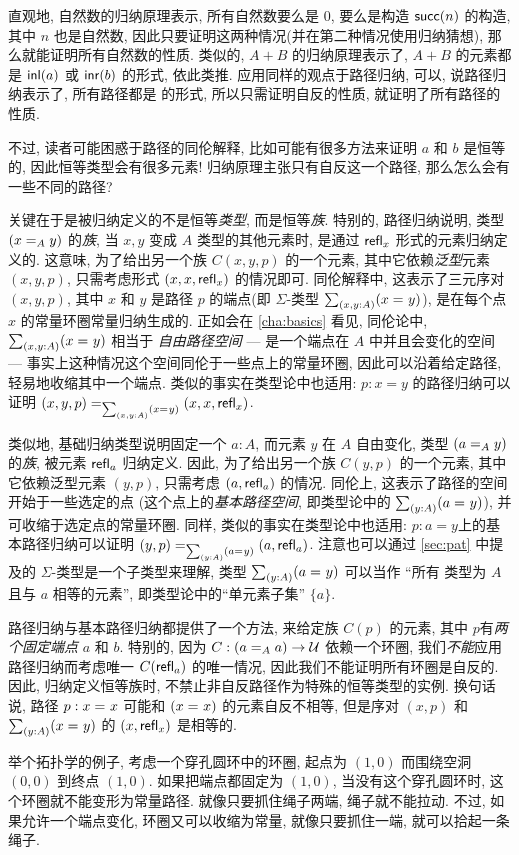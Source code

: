 \begin{rmk}
    \label{rmk:the-only-path-is-refl}
    直观地, 自然数的归纳原理表示, 所有自然数要么是 $0$, 要么是构造 $\suc(n)$ 的构造, 其中 $n$ 也是自然数, 因此只要证明这两种情况(并在第二种情况使用归纳猜想), 那么就能证明所有自然数的性质.
    类似的, $A+B$ 的归纳原理表示了, $A+B$ 的元素都是 $\inl(a)$ 或 $\inr(b)$ 的形式, 依此类推.
    应用同样的观点于路径归纳, 可以, 说路径归纳表示了, 所有路径都是  的形式, 所以只需证明自反的性质, 就证明了所有路径的性质.

    不过, 读者可能困惑于路径的同伦解释, 比如可能有很多方法来证明 $a$ 和 $b$ 是恒等的, 因此恒等类型会有很多元素!
    归纳原理主张只有自反这一个路径, 那么怎么会有一些不同的路径?

    关键在于是被归纳定义的不是恒等\emph{类型}, 而是恒等\emph{族}.
    特别的, 路径归纳说明, 类型 $(\id[A]{x}{y})$ 的\emph{族}, 当 $x,y$ 变成 $A$ 类型的其他元素时, 是通过 $\refl{x}$ 形式的元素归纳定义的.
    这意味, 为了给出另一个族 $C(x,y,p)$ 的一个元素, 其中它依赖\emph{泛型}元素 $(x,y,p)$, 只需考虑形式 $(x,x,\refl{x})$ 的情况即可.
    同伦解释中, 这表示了三元序对 $(x,y,p)$, 其中 $x$ 和 $y$ 是路径 $p$ 的端点(即 $\Sigma$-类型 $\sm{x,y:A}(\id{x}{y})$), 是在每个点 $x$ 的常量环圈常量归纳生成的.
    正如会在 \cref{cha:basics} 看见, 同伦论中, $\sm{x,y:A}(\id{x}{y})$ 相当于 \emph{自由路径空间} --- 是一个端点在 $A$ 中并且会变化的空间 --- 事实上这种情况这个空间同伦于一些点上的常量环圈, 因此可以沿着给定路径, 轻易地收缩其中一个端点.
    类似的事实在类型论中也适用: $p:x=y$ 的路径归纳可以证明 $\id[\sm{x,y:A}(\id{x}{y})]{(x,y,p)}{(x,x,\refl{x})}$.

    类似地, 基础归纳类型说明固定一个 $a:A$, 而元素 $y$ 在 $A$ 自由变化, 类型 $(\id[A]{a}{y})$ 的\emph{族}, 被元素 $\refl{a}$ 归纳定义.
    因此, 为了给出另一个族 $C(y,p)$ 的一个元素, 其中它依赖泛型元素 $(y,p)$, 只需考虑 $(a,\refl{a})$ 的情况.
    同伦上, 这表示了路径的空间开始于一些选定的点 (这个点上的\emph{基本路径空间}, 即类型论中的 $\sm{y:A} (\id{a}{y})$), 并可收缩于选定点的常量环圈.
    同样, 类似的事实在类型论中也适用: $p:a=y$上的基本路径归纳可以证明 $\id[\sm{y:A}(\id{a}{y})]{(y,p)}{(a,\refl{a})}$.
    注意也可以通过 \cref{sec:pat} 中提及的 $\Sigma$-类型是一个子类型来理解, 类型 $\sm{y:A}(\id{a}{y})$ 可以当作 ``所有 类型为 $A$ 且与 $a$ 相等的元素'', 即类型论中的``单元素子集'' $\{a\}$.

    路径归纳与基本路径归纳都提供了一个方法, 来给定族 $C(p)$ 的元素, 其中 $p$有\emph{两个固定端点} $a$ 和 $b$.
    特别的, 因为 $C: (\id[A]{a}{a}) \to \UU$ 依赖一个环圈, 我们\emph{不能}应用路径归纳而考虑唯一 $C(\refl{a})$ 的唯一情况, 因此我们不能证明所有环圈是自反的.
    因此, 归纳定义恒等族时, 不禁止非自反路径作为特殊的恒等类型的实例.
    换句话说, 路径 $p:\id{x}{x}$ 可能和 $(\id{x}{x})$ 的元素自反不相等, 但是序对 $(x,p)$ 和 $\sm{y:A}(\id{x}{y})$ 的 $(x,\refl{x})$ 是相等的.

    举个拓扑学的例子, 考虑一个穿孔圆环中的环圈, 起点为 $(1,0)$ 而围绕空洞 $(0,0)$ 到终点 $(1,0)$.
    如果把端点都固定为 $(1,0)$, 当没有这个穿孔圆环时, 这个环圈就不能变形为常量路径.
    就像只要抓住绳子两端, 绳子就不能拉动.
    不过, 如果允许一个端点变化, 环圈又可以收缩为常量, 就像只要抓住一端, 就可以拾起一条绳子.
\end{rmk}
